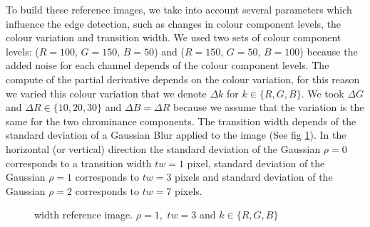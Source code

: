 \documentclass[twoside]{article}
\begin{document}
To build these reference images, we take into account several parameters which influence the edge detection, such as changes in colour component levels, the colour variation and transition width. We used two sets of colour component levels: ($R=100$, $G=150$, $B=50$) and ($R=150$, $G=50$, $B=100$) because the added noise for each channel depends of the colour component levels. The compute of the partial derivative depends on the colour variation, for this reason we varied this colour variation that we denote $\Delta k$ for $k\in\{R,G,B\}$. We took $\Delta G$ and $\Delta R\in\{10,20,30\}$ and $\Delta B=\Delta R$ because we assume that the variation is the same for the two chrominance components.
The transition width depends of the standard deviation of a Gaussian Blur applied to the image (See fig \ref{fig: image_reference_transition_width}). In the horizontal (or vertical) direction the standard deviation of the Gaussian $\rho=0$ corresponds to a transition width  $tw=1$ pixel, standard deviation of the Gaussian $\rho=1$ corresponds to $tw=3$ pixels and standard deviation of the Gaussian $\rho=2$ corresponds to $tw=7$ pixels. 
%	



\begin{figure}
	\centering
	\quad
	\caption[width reference image.]{width reference image. $\rho=1$,~$tw=3$ and $k\in\{R,G,B\}$}
	\label{fig: image_reference_transition_width}
\end{figure}
\end{document}
